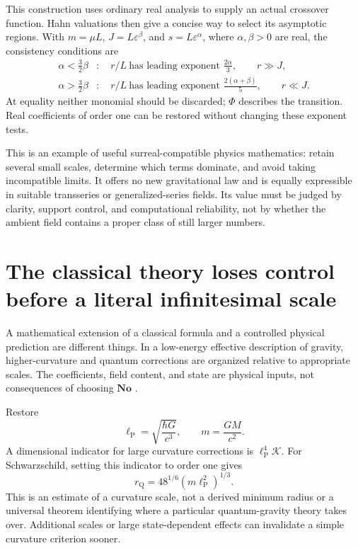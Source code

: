 \documentclass[11pt,letterpaper]{article}
\newcommand{\No}{\mathbf{No}}
\newcommand{\eps}{\varepsilon}
\newcommand{\Planck}{\ell_{\mathrm P}}
\newcommand{\Kretsch}{\mathcal K}
\theoremstyle{definition}
\theoremstyle{remark}
\begin{document}
This construction uses ordinary real analysis to supply an actual crossover
function. Hahn valuations then give a concise way to select its asymptotic
regions. With $m=\mu L$, $J=L\eps^\beta$, and $s=L\eps^\alpha$, where
$\alpha,\beta>0$ are real, the consistency conditions are
\begin{align}
 \alpha<\frac32\beta &: \quad
        r/L\ \text{has leading exponent }\frac{2\alpha}{3},
        \qquad r\gg J,\label{eq:radialsector}\\
 \alpha>\frac32\beta &: \quad
        r/L\ \text{has leading exponent }\frac{2(\alpha+\beta)}{5},
        \qquad r\ll J.\label{eq:angularsector}
\end{align}
At equality neither monomial should be discarded; $\Phi$ describes the
transition. Real coefficients of order one can be restored without changing
these exponent tests.

This is an example of useful surreal-compatible physics mathematics: retain
several small scales, determine which terms dominate, and avoid taking
incompatible limits. It offers no new gravitational law and is equally
expressible in suitable transseries or generalized-series fields. Its value
must be judged by clarity, support control, and computational reliability,
not by whether the ambient field contains a proper class of still larger
numbers.

\section{The classical theory loses control before a literal infinitesimal scale}
\label{sec:EFT}

A mathematical extension of a classical formula and a controlled physical
prediction are different things. In a low-energy effective description of
gravity, higher-curvature and quantum corrections are organized relative to
appropriate scales. The coefficients, field content, and state are physical
inputs, not consequences of choosing $\No$ \cite{Donoghue}.

Restore
\[
 \Planck=\sqrt{\frac{\hbar G}{c^3}},\qquad m=\frac{GM}{c^2}.
\]
A dimensional indicator for large curvature corrections is
$\Planck^4\Kretsch$. For Schwarzschild, setting this indicator to order one
gives
\begin{equation}
 r_{\mathrm Q}=48^{1/6}(m\Planck^2)^{1/3}.
 \label{eq:rQ}
\end{equation}
This is an estimate of a curvature scale, not a derived minimum radius or a
universal theorem identifying where a particular quantum-gravity theory takes
over. Additional scales or large state-dependent effects can invalidate a
simple curvature criterion sooner.
\end{document}
